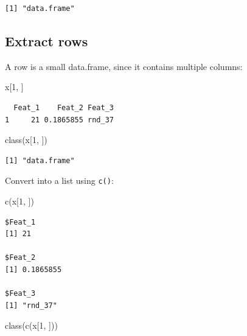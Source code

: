\documentclass[
]{book}
\newenvironment{Shaded}{\begin{snugshade}}{\end{snugshade}}
\newcommand{\DecValTok}[1]{\textcolor[rgb]{0.00,0.00,0.81}{#1}}
\newcommand{\FunctionTok}[1]{\textcolor[rgb]{0.00,0.00,0.00}{#1}}
\newcommand{\NormalTok}[1]{#1}
\begin{document}
\begin{verbatim}
[1] "data.frame"
\end{verbatim}

\hypertarget{extract-rows}{%
\subsection{Extract rows}\label{extract-rows}}

A row is a small data.frame, since it contains multiple columns:

\begin{Shaded}
\begin{Highlighting}[]
\NormalTok{x[}\DecValTok{1}\NormalTok{, ]}
\end{Highlighting}
\end{Shaded}

\begin{verbatim}
  Feat_1    Feat_2 Feat_3
1     21 0.1865855 rnd_37
\end{verbatim}

\begin{Shaded}
\begin{Highlighting}[]
\FunctionTok{class}\NormalTok{(x[}\DecValTok{1}\NormalTok{, ])}
\end{Highlighting}
\end{Shaded}

\begin{verbatim}
[1] "data.frame"
\end{verbatim}

Convert into a list using \texttt{c()}:

\begin{Shaded}
\begin{Highlighting}[]
\FunctionTok{c}\NormalTok{(x[}\DecValTok{1}\NormalTok{, ])}
\end{Highlighting}
\end{Shaded}

\begin{verbatim}
$Feat_1
[1] 21

$Feat_2
[1] 0.1865855

$Feat_3
[1] "rnd_37"
\end{verbatim}

\begin{Shaded}
\begin{Highlighting}[]
\FunctionTok{class}\NormalTok{(}\FunctionTok{c}\NormalTok{(x[}\DecValTok{1}\NormalTok{, ]))}
\end{Highlighting}
\end{Shaded}
\end{document}
